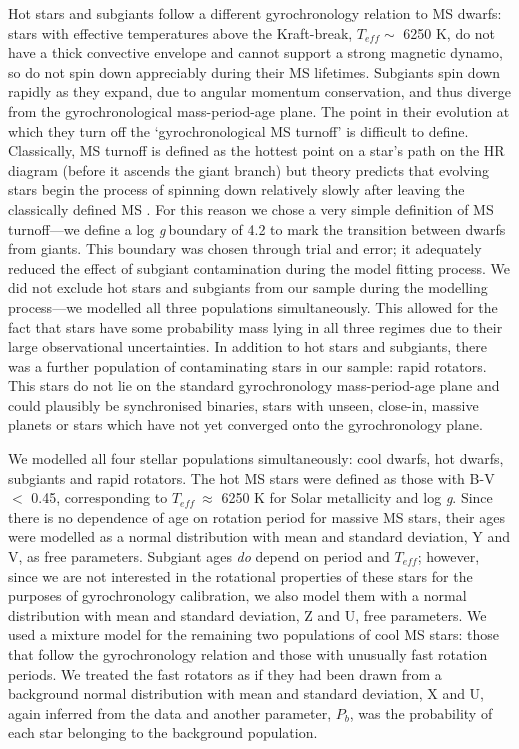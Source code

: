 \documentclass[10pt,preprint]{aastex}
\newcommand{\logg}{log \emph{g}}
\newcommand{\teff}{$T_{eff}$}
\begin{document}
Hot stars and subgiants follow a different gyrochronology relation to MS dwarfs: stars with effective temperatures above the Kraft-break, $T_{eff} \sim$ 6250 K, \citep{Kraft1967} do not have a thick convective envelope and cannot support a strong magnetic dynamo, so do not spin down appreciably during their MS lifetimes.
Subgiants spin down rapidly as they expand, due to angular momentum conservation, and thus diverge from the gyrochronological mass-period-age plane.
The point in their evolution at which they turn off the `gyrochronological MS turnoff' is difficult to define.
Classically, MS turnoff is defined as the hottest point on a star's path on the HR diagram (before it ascends the giant branch) but theory predicts that evolving stars begin the process of spinning down relatively slowly after leaving the classically defined MS \citep{vanSaders2013}.
For this reason we chose a very simple definition of MS turnoff---we define a \logg$~$boundary of 4.2 to mark the transition between dwarfs from giants.
This boundary was chosen through trial and error; it adequately reduced the effect of subgiant contamination during the model fitting process.
We did not exclude hot stars and subgiants from our sample during the modelling process---we modelled all three populations simultaneously.
This allowed for the fact that stars have some probability mass lying in all three regimes due to their large observational uncertainties.
In addition to hot stars and subgiants, there was a further population of contaminating stars in our sample: rapid rotators.
This stars do not lie on the standard gyrochronology mass-period-age plane and could plausibly be synchronised binaries, stars with unseen, close-in, massive planets \citep{Poppenhaeger2014, Beky2014} or stars which have not yet converged onto the gyrochronology plane.

We modelled all four stellar populations simultaneously: cool dwarfs, hot dwarfs, subgiants and rapid rotators.
The hot MS stars were defined as those with B-V $<$ 0.45, corresponding to \teff$~\approx$ 6250 K for Solar metallicity and \logg.
Since there is no dependence of age on rotation period for massive MS stars, their ages were modelled as a normal distribution with mean and standard deviation, Y and V, as free parameters.
Subgiant ages \emph{do} depend on period and $T_{eff}$; however, since we are not interested in the rotational properties of these stars for the purposes of gyrochronology calibration, we also model them with a normal distribution with mean and standard deviation, Z and U, free parameters.
We used a mixture model for the remaining two populations of cool MS stars: those that follow the gyrochronology relation and those with unusually fast rotation periods.
We treated the fast rotators as if they had been drawn from a background normal distribution with mean and standard deviation, X and U, again inferred from the data and another parameter, $P_b$, was the probability of each star belonging to the background population.
\end{document}
